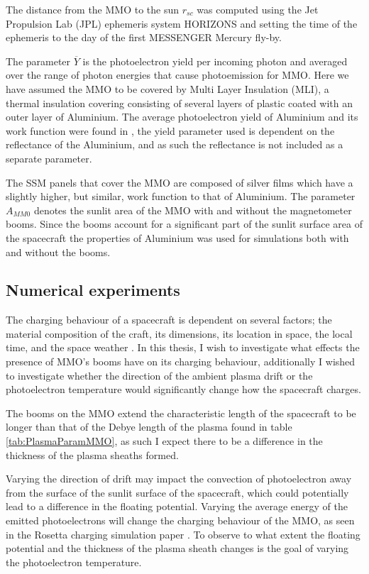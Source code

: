 The distance from the MMO to the sun $r_{sc}$ was computed using the Jet Propulsion Lab (JPL) ephemeris system HORIZONS and setting the time of the ephemeris to the day of the first MESSENGER Mercury fly-by.

The parameter $\overline{Y}$ is the photoelectron yield per incoming photon and averaged over the range of photon energies that cause photoemission for MMO. Here we have assumed the MMO to be covered by Multi Layer Insulation (MLI), a thermal insulation covering consisting of several layers of plastic coated with an outer layer of Aluminium. The average photoelectron yield of Aluminium and its work function were found in \parencite{Feuerbacher1972}, the yield parameter used is dependent on the reflectance of the Aluminium, and as such the reflectance is not included as a separate parameter. 

The SSM panels that cover the MMO are composed of silver films which have a slightly higher, but similar, work function to that of Aluminium. The parameter $A_{MM0}$ denotes the sunlit area of the MMO with and without the magnetometer booms. Since the booms account for a significant part of the sunlit surface area of the spacecraft the properties of Aluminium was used for simulations both with and without the booms.



\subsection{Numerical experiments}

The charging behaviour of a spacecraft is dependent on several factors; the material composition of the craft, its dimensions, its location in space, the local time, and the space weather \parencite{LAI2019} . In this thesis, I wish to investigate what effects the presence of MMO's booms have on its charging behaviour, additionally I wished to investigate whether the direction of the ambient plasma drift or the photoelectron temperature would significantly change how the spacecraft charges.

The booms on the MMO extend the characteristic length of the spacecraft to be longer than that of the Debye length of the plasma found in table \ref{tab:PlasmaParamMMO}, as such I expect there to be a difference in the thickness of the plasma sheaths formed. 

Varying the direction of drift may impact the convection of photoelectron away from the surface of the sunlit surface of the spacecraft, which could potentially lead to a difference in the floating potential. Varying the average energy of the emitted photoelectrons will change the charging behaviour of the MMO, as seen in the Rosetta charging simulation paper \parencite{Sjogren2012}. To observe to what extent the floating potential and the thickness of the plasma sheath changes is the goal of varying the photoelectron temperature. 

